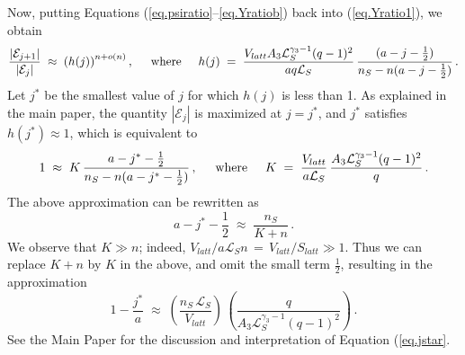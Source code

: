 \documentclass[journal=mamobx,manuscript=article]{achemso}
\newcommand{\leng}{\mathcal{L}}
\begin{document}
Now, putting Equations (\ref{eq.psiratio}--\ref{eq.Yratiob}) back into (\ref{eq.Yratio1}), we obtain
\begin{equation}
    \label{eq.Yratio2}
       \frac{|\mathcal{E}_{j+1}|}{|\mathcal{E}_j|} \; \approx \; 
       \left( h(j)\right)^{n+o(n)},
       \hspace{5mm}\hbox{where}\hspace{5mm}
       h(j)  \;=\;
       \frac{V_{latt}A_3\leng_S^{\gamma_3-1}(q-1)^2}{aq\leng_S} \,
          \frac{(a-j-\frac{1}{2})}{n_S-n(a-j-\frac{1}{2})}  \,.
\end{equation}
Let $j^*$ be the 
smallest value of $j$ for which $h(j)$ is less than 1.
As explained in the main paper, the quantity $|\mathcal{E}_j|$
is maximized at $j=j^*$, and $j^*$ satisfies 
$h(j^*)\approx 1$, which is equivalent to
\[     1  \;\approx \; 
     K  \,%
          \frac{a-j^*-\frac{1}{2}}{n_S-n(a-j^*-\frac{1}{2})}    \,,  
             \hspace{5mm}\hbox{where}\hspace{5mm}
             K \;=\;   \frac{ V_{latt} }{a\leng_S}\, \frac{   A_3\leng_S^{\gamma_3-1}(q-1)^2}{q} \,.
\]
The above approximation can be rewritten as 
\[       a-j^*-\frac{1}{2} \; \approx\;    \frac{n_S}{K+n}   \,.
\]
We observe that $K\gg n$; indeed,  $V_{latt}/a\leng_S n \,=\,V_{latt}/S_{latt}\gg 1$.  
Thus we can replace $K+n$ by $K$ in the above, and omit the small term $\frac{1}{2}$, resulting in the   
approximation 
\begin{equation}
    \label{eq.jstar}
     1-\frac{j^*}{a}     \; \approx   \; 
        \left(  \frac{n_S\,\leng_S}{V_{latt} }\right) \,\left(   \frac{q}{A_3\leng_S^{\gamma_3-1}(q-1)^2}\right)  \,.
\end{equation}
See the Main Paper for the discussion and interpretation of Equation (\ref{eq.jstar}.
\end{document}
